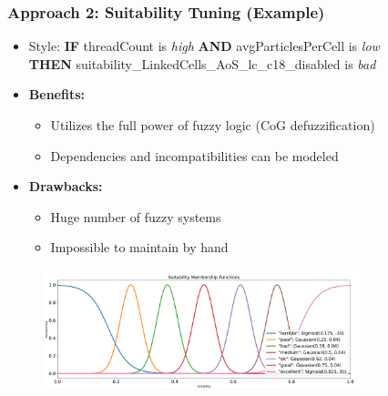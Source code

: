 \documentclass[
	10pt,
	t		%
]{beamer}
\begin{document}
\begin{frame}
	\frametitle{Approach 2: Suitability Tuning (Example)}
	\begin{itemize}
		\item Style: {\small
		      \textbf{IF} threadCount is \textit{high} \textbf{AND} avgParticlesPerCell is \textit{low}\\ \qquad \qquad \quad \textbf{THEN} suitability\_LinkedCells\_AoS\_lc\_c18\_disabled is \textit{bad}}

		\item \textbf{Benefits:}
		      \begin{itemize}
			      \item Utilizes the full power of fuzzy logic (CoG defuzzification)
			      \item Dependencies and incompatibilities can be modeled
		      \end{itemize}
		\item \textbf{Drawbacks:}
		      \begin{itemize}
			      \item Huge number of fuzzy systems
			      \item Impossible to maintain by hand
		      \end{itemize}
	\end{itemize}

	\begin{figure}
		\centering
		\includegraphics[width=0.82\textwidth,trim={0 0 0 1.8cm},clip]{figures/suitability-linguistic-variable.png}
	\end{figure}

\end{frame}
\end{document}
